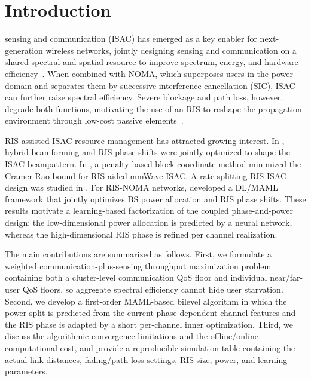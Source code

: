 \documentclass[10pt,journal]{IEEEtran}
\begin{document}
\section{Introduction}
 sensing and communication (ISAC) has emerged as a
key enabler for next-generation wireless networks, jointly designing sensing
and communication on a shared spectral and spatial resource to improve
spectrum, energy, and hardware efficiency~\cite{liu2022isac,deng2025mmwave}.
When combined with NOMA, which superposes users in the power domain and
separates them by successive interference cancellation (SIC), ISAC can further
raise spectral efficiency. Severe blockage and path loss, however, degrade both
functions, motivating the use of an RIS to reshape the propagation environment
through low-cost passive elements~\cite{wu2020ris}.

RIS-assisted ISAC resource management has attracted growing interest. In
\cite{wang2025hybrid}, hybrid beamforming and RIS phase shifts were jointly
optimized to shape the ISAC beampattern. In \cite{lyu2024crb}, a penalty-based
block-coordinate method minimized the Cramer-Rao bound for RIS-aided mmWave
ISAC. A rate-splitting RIS-ISAC design was studied in \cite{ke2025rsma}. For
RIS-NOMA networks, \cite{zou2023ml} developed a DL/MAML framework that jointly
optimizes BS power allocation and RIS phase shifts. These results motivate a
learning-based factorization of the coupled phase-and-power design: the
low-dimensional power allocation is predicted by a neural network, whereas the
high-dimensional RIS phase is refined per channel realization.

The main contributions are summarized as follows. First, we formulate a
weighted communication-plus-sensing throughput maximization problem containing
both a cluster-level communication QoS floor and individual near/far-user QoS
floors, so aggregate spectral efficiency cannot hide user starvation. Second,
we develop a first-order MAML-based bilevel algorithm in which the power split
is predicted from the current phase-dependent channel features and the RIS phase
is adapted by a short per-channel inner optimization. Third, we discuss the
algorithmic convergence limitations and the offline/online computational cost,
and provide a reproducible simulation table containing the actual link
distances, fading/path-loss settings, RIS size, power, and learning parameters.

\end{document}
